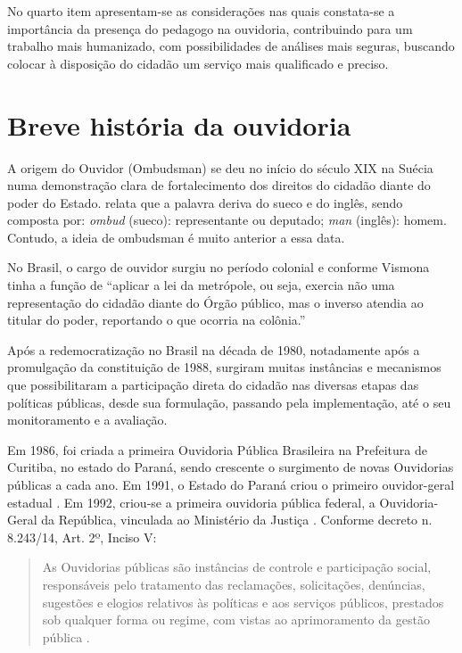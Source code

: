 \begin{refsection}
    No quarto item apresentam-se as considerações nas quais constata-se a importância da presença do pedagogo na ouvidoria, contribuindo para um trabalho mais humanizado, com possibilidades de análises mais seguras, buscando colocar à disposição do cidadão um serviço mais qualificado e preciso.  


    \section{Breve história da ouvidoria}

    A origem do Ouvidor (Ombudsman) se deu no início do século XIX na Suécia numa demonstração clara de fortalecimento dos direitos do cidadão diante do poder do Estado. \textcite{FERREIRA2004Novo} relata que a palavra deriva do sueco e do inglês, sendo composta por: \textit{ombud} (sueco): representante ou deputado; \textit{man} (inglês): homem. Contudo, a ideia de ombudsman é muito anterior a essa data.

    No Brasil, o cargo de ouvidor surgiu no período colonial e conforme Vismona \cite[2001, p.~11 apud][p.~11]{PEREIRA2013Ouvidoria} tinha a função de “aplicar a lei da metrópole, ou seja, exercia não uma representação do cidadão diante do Órgão público, mas o inverso atendia ao titular do poder, reportando o que ocorria na colônia.”   

    Após a redemocratização no Brasil na década de 1980, notadamente após a promulgação da constituição de 1988, surgiram muitas instâncias e mecanismos que possibilitaram a participação direta do cidadão nas diversas etapas das políticas públicas, desde sua formulação, passando pela implementação, até o seu monitoramento e a avaliação.  

    Em 1986, foi criada a primeira Ouvidoria Pública Brasileira na Prefeitura de Curitiba, no estado do Paraná, sendo crescente o surgimento de novas Ouvidorias públicas a cada ano. Em 1991, o Estado do Paraná criou o primeiro ouvidor-geral estadual \cite{PINTO1998Ombudsman, Ouvidoria2003}. Em 1992, criou-se a primeira ouvidoria pública federal, a Ouvidoria-Geral da República, vinculada ao Ministério da Justiça \cite{Ouvidoria2003}. Conforme decreto n. 8.243/14, Art. 2º, Inciso V:

    \begin{quotation}
        As Ouvidorias públicas são instâncias de controle e participação social, responsáveis pelo tratamento das reclamações, solicitações, denúncias, sugestões e elogios relativos às políticas e aos serviços públicos, prestados sob qualquer forma ou regime, com vistas ao aprimoramento da gestão pública \cite[p.~1]{Decreto8243-2014}.  
    \end{quotation}


\end{refsection}

